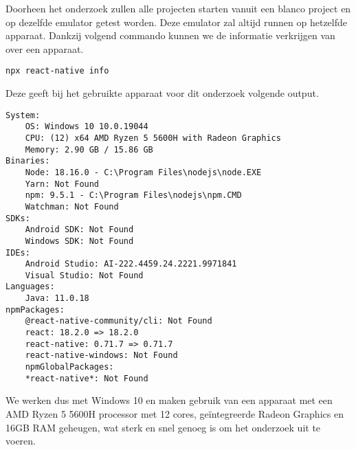 Doorheen het onderzoek zullen alle projecten starten vanuit een blanco project en op dezelfde emulator 
getest worden. Deze emulator zal altijd runnen op hetzelfde apparaat. Dankzij volgend commando 
kunnen we de informatie verkrijgen van over een apparaat.
\begin{verbatim}
npx react-native info
\end{verbatim}
Deze geeft bij het gebruikte apparaat voor dit onderzoek volgende output.
\begin{verbatim}
System:
    OS: Windows 10 10.0.19044
    CPU: (12) x64 AMD Ryzen 5 5600H with Radeon Graphics
    Memory: 2.90 GB / 15.86 GB
Binaries:
    Node: 18.16.0 - C:\Program Files\nodejs\node.EXE
    Yarn: Not Found
    npm: 9.5.1 - C:\Program Files\nodejs\npm.CMD
    Watchman: Not Found
SDKs:
    Android SDK: Not Found
    Windows SDK: Not Found
IDEs:
    Android Studio: AI-222.4459.24.2221.9971841
    Visual Studio: Not Found
Languages:
    Java: 11.0.18
npmPackages:
    @react-native-community/cli: Not Found
    react: 18.2.0 => 18.2.0 
    react-native: 0.71.7 => 0.71.7 
    react-native-windows: Not Found
    npmGlobalPackages:
    *react-native*: Not Found
\end{verbatim}
We werken dus met Windows 10 en maken gebruik van een apparaat met een AMD Ryzen 5 5600H processor 
met 12 cores, geïntegreerde Radeon Graphics en 16GB RAM geheugen, wat sterk en snel 
genoeg is om het onderzoek uit te voeren.
